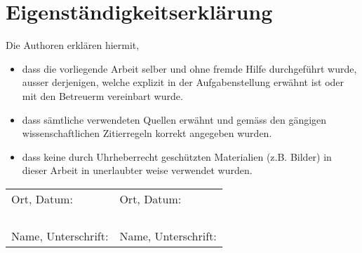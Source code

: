 \documentclass[]{subfiles}
\begin{document}
\section*{Eigenständigkeitserklärung}
    Die Authoren erklären hiermit,
    \begin{itemize}
        \item dass die vorliegende Arbeit selber und ohne fremde Hilfe durchgeführt wurde,
        ausser derjenigen, welche explizit in der Aufgabenstellung erwähnt ist oder mit den Betreuerm vereinbart wurde.
        \item dass sämtliche verwendeten Quellen erwähnt und gemäss den gängigen wissenschaftlichen Zitierregeln korrekt angegeben wurden.
        \item dass keine durch Uhrheberrecht geschützten Materialien (z.B. Bilder) in dieser Arbeit in unerlaubter weise verwendet wurden.
        \newline
        \newline
        \newline
        \newline
    \end{itemize}
    
    \begin{tabularx}{\textwidth}{XX}
        Ort, Datum: & Ort, Datum: \\
        & \\
        & \\
        & \\
        & \\
        Name, Unterschrift: & Name, Unterschrift: \\
    \end{tabularx}
    
\end{document}
